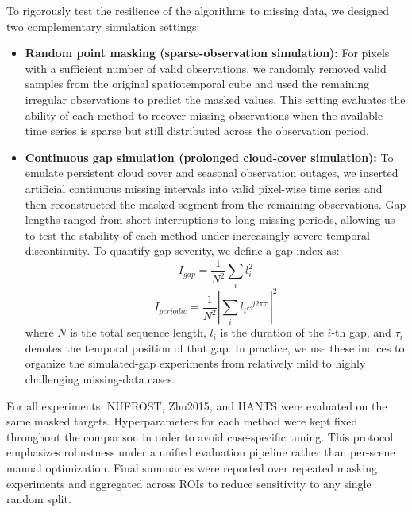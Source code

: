 \documentclass[letterpaper,journal]{IEEEtran}
\begin{document}
To rigorously test the resilience of the algorithms to missing data, we designed two complementary simulation settings:
\begin{itemize}
    \item \textbf{Random point masking (sparse-observation simulation):} For pixels with a sufficient number of valid observations, we randomly removed valid samples from the original spatiotemporal cube and used the remaining irregular observations to predict the masked values. This setting evaluates the ability of each method to recover missing observations when the available time series is sparse but still distributed across the observation period.
    \item \textbf{Continuous gap simulation (prolonged cloud-cover simulation):} To emulate persistent cloud cover and seasonal observation outages, we inserted artificial continuous missing intervals into valid pixel-wise time series and then reconstructed the masked segment from the remaining observations. Gap lengths ranged from short interruptions to long missing periods, allowing us to test the stability of each method under increasingly severe temporal discontinuity. To quantify gap severity, we define a gap index as:
    \begin{equation}
    \label{eq:gap_index}
    I_{gap}=\frac{1}{N^2}\sum_i{l_i^2}
    \end{equation}
    \begin{equation}
    \label{eq:gap_index_periodic}
    I_{periodic} = \frac{1}{N^2}\left|\sum_i l_i e^{j2\pi\tau_i}\right|^2
    \end{equation}
    where $N$ is the total sequence length, $l_i$ is the duration of the $i$-th gap, and $\tau_i$ denotes the temporal position of that gap. In practice, we use these indices to organize the simulated-gap experiments from relatively mild to highly challenging missing-data cases.
\end{itemize}

For all experiments, NUFROST, Zhu2015, and HANTS were evaluated on the same masked targets. Hyperparameters for each method were kept fixed throughout the comparison in order to avoid case-specific tuning. This protocol emphasizes robustness under a unified evaluation pipeline rather than per-scene manual optimization. Final summaries were reported over repeated masking experiments and aggregated across ROIs to reduce sensitivity to any single random split.
\end{document}
